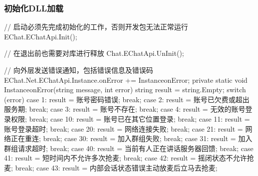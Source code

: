 \documentclass[letterpaper,10pt,english]{sphinxmanual}
\begin{document}
\subsubsection{初始化DLL加载}
\label{\detokenize{csharp:dll}}
%
\begin{sphinxVerbatim}[commandchars=\\\{\}]
// 启动必须先完成初始化的工作，否则开发包无法正常运行
EChat.EChatApi.Init();

// 在退出前也需要对库进行释放
Chat.EChatApi.UnInit();

// 向外层发送错误通知，包括错误信息及错误码
EChat.Net.EChatApi.Instance.onError += Instance\PYGZus{}onError;
private static void Instance\PYGZus{}onError(string message, int error)
        \PYGZob{}
            string result = string.Empty;
            switch (error)
            \PYGZob{}
                case \PYGZhy{}1:
                    result = \PYGZdq{}账号密码错误\PYGZdq{};
                    break;
                case \PYGZhy{}2:
                    result = \PYGZdq{}账号已欠费或超出服务期\PYGZdq{};
                    break;
                case \PYGZhy{}3:
                    result = \PYGZdq{}账号不存在\PYGZdq{};
                    break;
                case \PYGZhy{}4:
                    result = \PYGZdq{}无效的账号登录权限\PYGZdq{};
                    break;
                case \PYGZhy{}10:
                    result = \PYGZdq{}账号已在其它位置登录\PYGZdq{};
                    break;
                case \PYGZhy{}11:
                    result = \PYGZdq{}账号登录超时\PYGZdq{};
                    break;
                case \PYGZhy{}20:
                    result = \PYGZdq{}网络连接失败\PYGZdq{};
                    break;
                case \PYGZhy{}21:
                    result = \PYGZdq{}网络正在重连\PYGZdq{};
                    break;
                case \PYGZhy{}30:
                    result = \PYGZdq{}加入群组失败\PYGZdq{};
                    break;
                case \PYGZhy{}31:
                    result = \PYGZdq{}加入群组请求超时\PYGZdq{};
                    break;
                case \PYGZhy{}40:
                    result = \PYGZdq{}当前有人正在讲话\PYGZlt{}服务器回馈\PYGZgt{}\PYGZdq{};
                    break;
                case \PYGZhy{}41:
                    result = \PYGZdq{}短时间内不允许多次抢麦\PYGZdq{};
                    break;
                case \PYGZhy{}42:
                    result = \PYGZdq{}摇闭状态不允许抢麦\PYGZdq{};
                    break;
                case \PYGZhy{}43:
                    result = \PYGZdq{}内部会话状态错误\PYGZlt{}主动放麦后立马去抢麦\PYGZgt{}\PYGZdq{};

\end{sphinxVerbatim}
\end{document}
